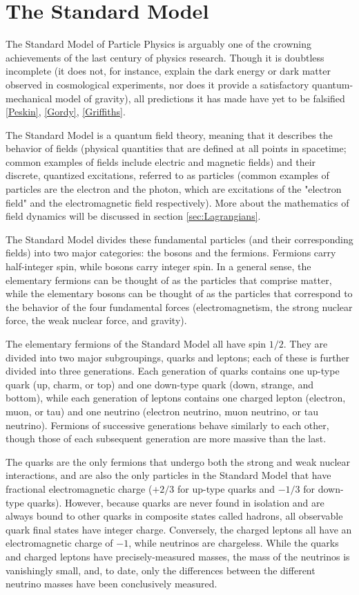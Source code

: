 \section{The Standard Model} \label{sec:SM} 

The Standard Model of Particle Physics is arguably one of the crowning achievements of the last century of physics research. Though it is doubtless incomplete (it does not, for instance, explain the dark energy or dark matter observed in cosmological experiments, nor does it provide a satisfactory quantum-mechanical model of gravity), all predictions it has made have yet to be falsified \ref{Peskin}, \ref{Gordy}, \ref{Griffiths}.

The Standard Model is a quantum field theory, meaning that it describes the behavior of fields (physical quantities that are defined at all points in spacetime; common examples of fields include electric and magnetic fields) and their discrete, quantized excitations, referred to as particles (common examples of particles are the electron and the photon, which are excitations of the "electron field" and the electromagnetic field respectively). More about the mathematics of field dynamics will be discussed in section \ref{sec:Lagrangians}.

The Standard Model divides these fundamental particles (and their corresponding fields) into two major categories: the bosons and the fermions. Fermions carry half-integer spin, while bosons carry integer spin. In a general sense, the elementary fermions can be thought of as the particles that comprise matter, while the elementary bosons can be thought of as the particles that correspond to the behavior of the four fundamental forces (electromagnetism, the strong nuclear force, the weak nuclear force, and gravity).

The elementary fermions of the Standard Model all have spin $1/2$. They are divided into two major subgroupings, quarks and leptons; each of these is further divided into three generations. Each generation of quarks contains one up-type quark (up, charm, or top) and one down-type quark (down, strange, and bottom), while each generation of leptons contains one charged lepton (electron, muon, or tau) and one neutrino (electron neutrino, muon neutrino, or tau neutrino). Fermions of successive generations behave similarly to each other, though those of each subsequent generation are more massive than the last.

The quarks are the only fermions that undergo both the strong and weak nuclear interactions, and are also the only particles in the Standard Model that have fractional electromagnetic charge ($+2/3$ for up-type quarks and $-1/3$ for down-type quarks). However, because quarks are never found in isolation and are always bound to other quarks in composite states called hadrons, all observable quark final states have integer charge. Conversely, the charged leptons all have an electromagnetic charge of $-1$, while neutrinos are chargeless. While the quarks and charged leptons have precisely-measured masses, the mass of the neutrinos is vanishingly small, and, to date, only the differences between the different neutrino masses have been conclusively measured.

